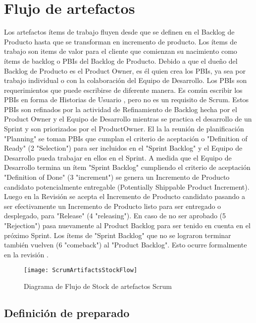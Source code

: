 \section{Flujo de artefactos}

Los artefactos ítems de trabajo fluyen desde que se definen en el Backlog de Producto hasta que se transforman en incremento de producto. Los ítems de trabajo son items de valor para el cliente que comienzan su nacimiento como ítems de backlog o PBIs del Backlog de Producto. Debido a que el dueño del Backlog de Producto es el Product Owner, es él quien crea los PBIs, ya sea por trabajo individual o con la colaboración del Equipo de Desarrollo. Los PBIs son requerimientos que puede escribirse de diferente manera. Es común escribir los PBIs en forma de Historias de Usuario \cite{Cohn-2004}, pero no es un requisito de Scrum. Estos PBIs son refinados por la actividad de Refinamiento de Backlog hecha por el Product Owner y el Equipo de Desarrollo mientras se practica el desarrollo de un Sprint y son priorizados por el ProductOwner. El la la reunión de planificación "Planning" se toman PBIs que cumplan el criterio de aceptación o "Definition of Ready" (2 "Selection") para ser incluidos en el "Sprint Backlog" y el Equipo de Desarrollo pueda trabajar en ellos en el Sprint. A medida que el Equipo de Desarrollo termina un ítem "Sprint Backlog" cumpliendo el criterio de aceptación "Definition of Done" (3 "increment") se genera un Incremento de Producto candidato potencialmente entregable (Potentially Shippable Product Increment). Luego en la Revisión se acepta el Incremento de Producto candidato pasando a ser efectivamente un Incremento de Producto listo para ser entregado o desplegado, para "Release" (4 "releasing"). En caso de no ser aprobado (5 "Rejection") pasa nuevamente al Product Backlog para ser tenido en cuenta en el próximo Sprint. Los ítems de "Sprint Backlog" que no se lograron terminar también vuelven (6 "comeback") al "Product Backlog". Esto ocurre formalmente en la revisión \cite{Martin-Alaimo-2014}.

\begin{figure}[h]
  \centering
  \texttt{[image: ScrumArtifactsStockFlow]}
  \caption{Diagrama de Flujo de Stock de artefactos Scrum}
  \centering
  \label{fig:ScrumArtifactsStockFlow} %
\end{figure}

\subsection{Definición de preparado}

